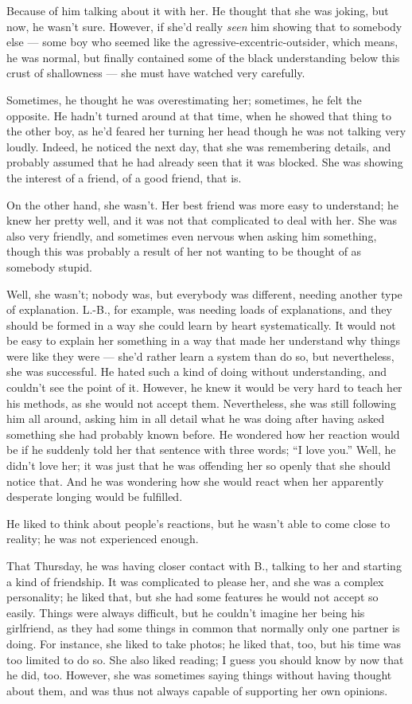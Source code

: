 Because of him talking about it with her. He thought that she was joking, but now, he wasn't sure. However, if she'd really \emph{seen} him showing that to somebody else --- some boy who seemed like the agressive-excentric-outsider, which means, he was normal, but finally contained some of the black understanding below this crust of shallowness --- she must have watched very carefully.

Sometimes, he thought he was overestimating her; sometimes, he felt the opposite. He hadn't turned around at that time, when he showed that thing to the other boy, as he'd feared her turning her head though he was not talking very loudly. Indeed, he noticed the next day, that she was remembering details, and probably assumed that he had already seen that it was blocked. She was showing the interest of a friend, of a good friend, that is.

On the other hand, she wasn't. Her best friend was more easy to understand; he knew her pretty well, and it was not that complicated to deal with her. She was also very friendly, and sometimes even nervous when asking him something, though this was probably a result of her not wanting to be thought of as somebody stupid.

Well, she wasn't; nobody was, but everybody was different, needing another type of explanation. L.-B., for example, was needing loads of explanations, and they should be formed in a way she could learn by heart systematically. It would not be easy to explain her something in a way that made her understand why things were like they were --- she'd rather learn a system than do so, but nevertheless, she was successful. He hated such a kind of doing without understanding, and couldn't see the point of it. However, he knew it would be very hard to teach her his methods, as she would not accept them. Nevertheless, she was still following him all around, asking him in all detail what he was doing after having asked something she had probably known before. He wondered how her reaction would be if he suddenly told her that sentence with three words; \enquote{I love you.} Well, he didn't love her; it was just that he was offending her so openly that she should notice that. And he was wondering how she would react when her apparently desperate longing would be fulfilled.

He liked to think about people's reactions, but he wasn't able to come close to reality; he was not experienced enough.

That Thursday, he was having closer contact with B., talking to her and starting a kind of friendship. It was complicated to please her, and she was a complex personality; he liked that, but she had some features he would not accept so easily. Things were always difficult, but he couldn't imagine her being his girlfriend, as they had some things in common that normally only one partner is doing. For instance, she liked to take photos; he liked that, too, but his time was too limited to do so. She also liked reading; I guess you should know by now that he did, too. However, she was sometimes saying things without having thought about them, and was thus not always capable of supporting her own opinions.

